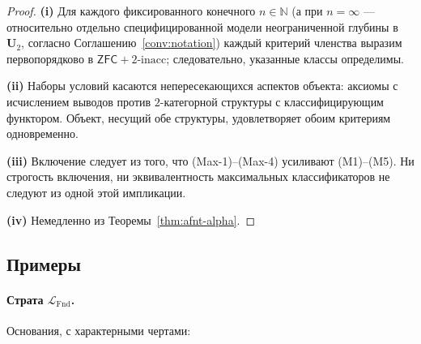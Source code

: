\documentclass[11pt]{article}
\theoremstyle{plain}
\theoremstyle{definition}
\newcommand{\LFnd}{\mathcal{L}_{\mathrm{Fnd}}}
\newcommand{\ZFC}{\mathsf{ZFC}}
\begin{document}
\begin{proof}
\textbf{(i)} Для каждого фиксированного конечного $n \in \mathbb{N}$ (а при $n = \infty$ — относительно отдельно специфицированной модели неограниченной глубины в $\mathbf{U}_2$, согласно Соглашению~\ref{conv:notation}) каждый критерий членства выразим первопорядково в $\ZFC + 2\text{-inacc}$; следовательно, указанные классы определимы.

\textbf{(ii)} Наборы условий касаются непересекающихся аспектов объекта: аксиомы с исчислением выводов против $2$-категорной структуры с классифицирующим функтором. Объект, несущий обе структуры, удовлетворяет обоим критериям одновременно.

\textbf{(iii)} Включение следует из того, что (Max-1)--(Max-4) усиливают (M1)--(M5). Ни строгость включения, ни эквивалентность максимальных классификаторов не следуют из одной этой импликации.

\textbf{(iv)} Немедленно из Теоремы~\ref{thm:afnt-alpha}.
\end{proof}

\subsection{Примеры}

\paragraph{Страта $\LFnd$.} Основания, с характерными чертами:
\end{document}
